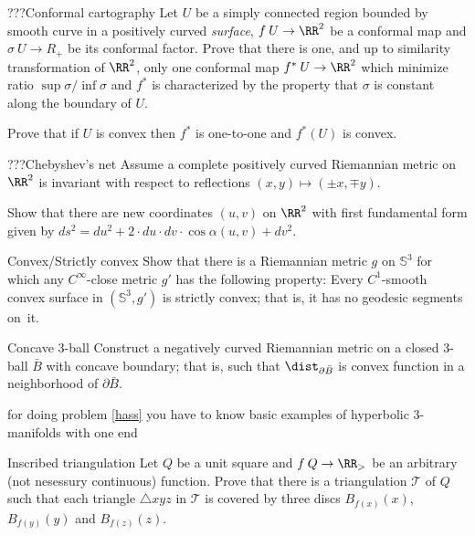 \begin{pr}{}{???Conformal cartography}
Let $U$ be a simply connected region
bounded by smooth curve in a positively curved \emph{surface}, $f\:U\to \RR^2$
be a conformal map and $\sigma\:U\to R_+$ be its conformal factor.
Prove that there is one, and up to similarity transformation of $\RR^2$,
only one conformal map $f^*\:U\to \RR^2$ which minimize ratio
$\sup\sigma/\inf\sigma$ and $f^*$ is characterized by the property that $\sigma$
is constant along the boundary of $U$.

Prove that if $U$ is convex then $f^*$
is one-to-one and $f^*(U)$ is convex.
\end{pr}

\begin{pr}{}{???Chebyshev's net}
Assume a complete positively curved Riemannian metric on $\RR^2$ is invariant with respect to reflections $(x,y)\mapsto (\pm x,\mp y)$.

Show that there are new coordinates $(u,v)$ on $\RR^2$ with first fundamental form given by
\def\d{d}
$\d s^2=\d u^2+2\cdot\d u\cdot\d v\cdot \cos\alpha(u,v)+\d v^2$.
\end{pr}

\begin{pr}{}{Convex/Strictly convex}\label{strict-convex} 
Show that there is a Riemannian metric $g$ on $\mathbb{S}^3$ for which any  $C^\infty$-close metric $g'$ has the following property: 
Every $C^1$-smooth convex surface in $(\mathbb{S}^3,g')$ is strictly convex; 
that is, it has no geodesic segments on~it.
\sign{}
\end{pr}

\begin{pr}{\thm}{Concave 3-ball}\label{hass}
Construct a negatively curved Riemannian metric on a closed 3-ball $\bar B$ with concave boundary; 
that is, such that  $\dist_{\partial \bar B}$ is convex function in a neighborhood of $\partial \bar B$.
\end{pr}
for doing problem \ref{hass} you have to know basic examples of hyperbolic 3-manifolds with one end








\begin{pr}{}{Inscribed triangulation}
Let $Q$ be a unit square and $f\:Q\to\RR_>$ be an arbitrary (not nesessury continuous) function.
Prove that there is a triangulation $\mathcal T$ of $Q$ such that each triangle $\triangle xyz$ in $\mathcal T$ is covered by three discs $B_{f(x)}(x)$, $B_{f(y)}(y)$ and $B_{f(z)}(z)$.
\end{pr}




